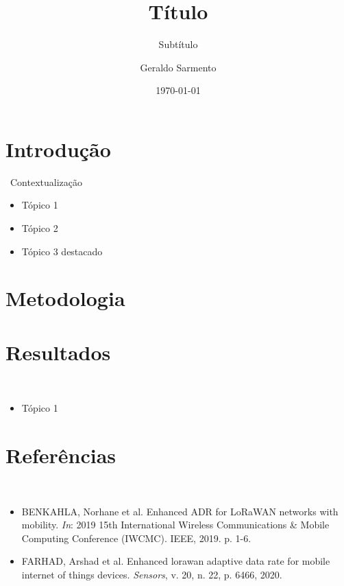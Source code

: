 \documentclass[10pt,aspectratio=169]{beamer}
\title{\textbf{Título}}
\subtitle{Subtítulo}
\author{Geraldo Sarmento}
\date{\today}
\begin{document}
\maketitle

\section{Introdução}

\begin{frame}{\thesection \, \secname}{Contextualização}
	\begin{itemize}[<+->]
		\item Tópico 1 
            \item Tópico 2
            \item Tópico 3 \textcolor{azul}{destacado}
	\end{itemize}
\end{frame}

\section{Metodologia}

\section{Resultados}

\begin{frame}{\thesection \, \secname}{}
	\begin{itemize}
		\item Tópico 1
	\end{itemize}
\end{frame}



\section*{Referências}
\begin{frame}{\thesection \, \secname}{}
        \begin{footnotesize}
	\begin{itemize}
            \vspace*{-0.5cm}
		\item BENKAHLA, Norhane et al. Enhanced ADR for LoRaWAN networks with mobility. \textit{In}: 2019 15th International Wireless Communications \& Mobile Computing Conference (IWCMC). IEEE, 2019. p. 1-6.
  
            \item FARHAD, Arshad et al. Enhanced lorawan adaptive data rate for mobile internet of things devices. \textit{Sensors}, v. 20, n. 22, p. 6466, 2020.
	\end{itemize}	
        \end{footnotesize}
\end{frame}

\backmatter
\end{document}

